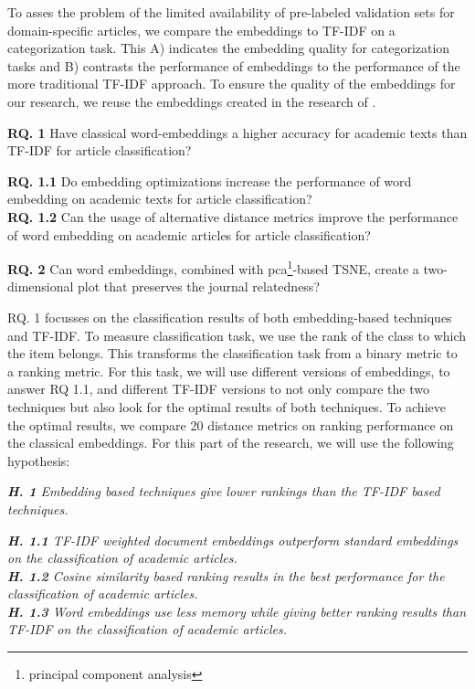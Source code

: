 \documentclass[../../Thesis.tex]{subfiles}
\begin{document}
To asses the problem of the limited availability of pre-labeled validation sets for domain-specific articles, we compare the embeddings to  TF-IDF on a categorization task. This A) indicates the embedding quality for categorization tasks and B) contrasts the performance of embeddings to the performance of the more traditional TF-IDF approach. To ensure the quality of the embeddings for our research, we reuse the embeddings created in the research of \citet{Truong2017Thesis}.
\begin{jumpin}
    \textbf{RQ. 1} Have classical word-embeddings a higher accuracy for academic texts than TF-IDF for article classification?\\
    \begin{adjustwidth}{0.3in}{}
        \textbf{RQ. 1.1} Do embedding optimizations increase the performance of word embedding on academic texts for article classification?\\
        \textbf{RQ. 1.2} Can the usage of alternative distance metrics improve the performance of word embedding on academic articles for article classification?
    \end{adjustwidth}
    \vspace{0.1in}\textbf{RQ. 2} Can word embeddings, combined with pca\footnote{principal component analysis}-based TSNE, create a two-dimensional plot that preserves the journal relatedness?
\end{jumpin}
RQ. 1 focusses on the classification results of both embedding-based techniques and TF-IDF.  To measure classification task, we use the rank of the class to which the item belongs. This transforms the classification task from a binary metric to a ranking metric. For this task, we will use different versions of embeddings, to answer RQ 1.1, and different TF-IDF versions to not only compare the two techniques but also look for the optimal results of both techniques. To achieve the optimal results, we compare 20 distance metrics on ranking performance on the classical embeddings. For this part of the research, we will use the following hypothesis:
\begin{jumpin}
\textit{\textbf{H. 1} Embedding based techniques give lower rankings than the TF-IDF based techniques.}
\begin{jumpin}
\textit{\textbf{H. 1.1} TF-IDF weighted document embeddings outperform standard embeddings on the classification of academic articles.}\\
\textit{\textbf{H. 1.2} Cosine similarity based ranking results in the best performance for the classification of academic articles.}\\
\textit{\textbf{H. 1.3} Word embeddings use less memory while giving better ranking results than TF-IDF on the classification of academic articles.}
\end{jumpin}
\end{jumpin}
\end{document}
